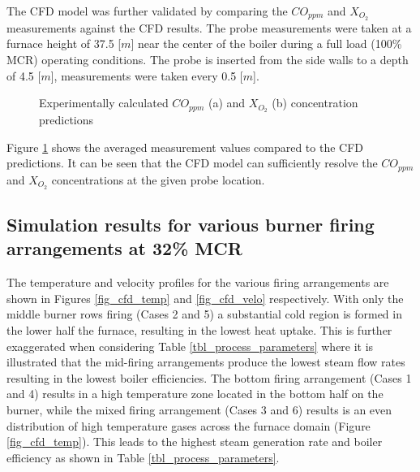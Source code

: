 \documentclass[review]{elsarticle}
\begin{document}
The CFD model was further validated by comparing the $CO_{ppm}$ and $X_{O_{2}}$ measurements against the CFD results. The probe measurements were taken at a furnace height of 37.5 [$m$] near the center of the boiler during a full load (100\% MCR) operating conditions. The probe is inserted from the side walls to a depth of 4.5 [$m$], measurements were taken every 0.5 [$m$].\\
\begin{figure}[h!]
\centering
{}
\hspace{5mm}
\caption{Experimentally calculated $CO_{ppm}$ (a) and $X_{O_{2}}$ (b) concentration predictions}
\label{fig_probe_valid}
\end{figure}
Figure \ref{fig_probe_valid} shows the averaged measurement values compared to the CFD predictions. It can be seen that the CFD model can sufficiently resolve the $CO_{ppm}$ and $X_{O_{2}}$ concentrations at the given probe location.
\newpage
\subsection{Simulation results for various burner firing arrangements at 32\% MCR }
The temperature and velocity profiles for the various firing arrangements are shown in Figures \ref{fig_cfd_temp} and \ref{fig_cfd_velo} respectively. With only the middle burner rows firing (Cases 2 and 5) a substantial cold region is formed in the lower half the furnace, resulting in the lowest heat uptake. This is further exaggerated when considering Table \ref{tbl_process_parameters} where it is illustrated that the mid-firing arrangements produce the lowest steam flow rates resulting in the lowest boiler efficiencies. The bottom firing arrangement (Cases 1 and 4) results in a high temperature zone located in the bottom half on the burner, while the mixed firing arrangement (Cases 3 and 6) results is an even distribution of high temperature gases across the furnace domain (Figure \ref{fig_cfd_temp}). This leads to the highest steam generation rate and boiler efficiency as shown in Table \ref{tbl_process_parameters}.
\end{document}
